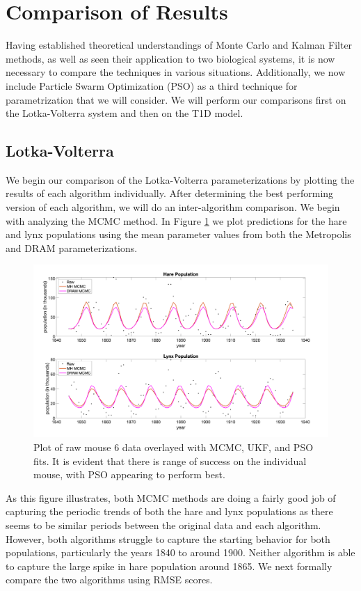 \section{Comparison of Results} \label{RESULTS}

Having established theoretical understandings of Monte Carlo and Kalman Filter methods, as well as seen their application to two biological systems, it is now necessary to compare the techniques in various situations. Additionally, we now include Particle Swarm Optimization (PSO) as a third technique for parametrization that we will consider. We will perform our comparisons first on the Lotka-Volterra system and then on the T1D model.

\subsection{Lotka-Volterra}
We begin our comparison of the Lotka-Volterra parameterizations by plotting the results of each algorithm individually. After determining the best performing version of each algorithm, we will do an inter-algorithm comparison. We begin with analyzing the MCMC method. In Figure \ref{fig:LVmcmc} we plot predictions for the hare and lynx populations using the mean parameter values from both the Metropolis and DRAM parameterizations.
\begin{figure}[H]
    \centering
    \includegraphics[width=15cm]{Final_Paper_Pieces/LV_Comparison_Figs/LVMCMC.png}
    \caption{Plot of raw mouse 6 data overlayed with MCMC, UKF, and PSO fits. It is evident that there is range of success on the individual mouse, with PSO appearing to perform best.}
    \label{fig:LVmcmc}
\end{figure}
As this figure illustrates, both MCMC methods are doing a fairly good job of capturing the periodic trends of both the hare and lynx populations as there seems to be similar periods between the original data and each algorithm. However, both algorithms struggle to capture the starting behavior for both populations, particularly the years 1840 to around 1900. Neither algorithm is able to capture the large spike in hare population around 1865. We next formally compare the two algorithms using RMSE scores.
